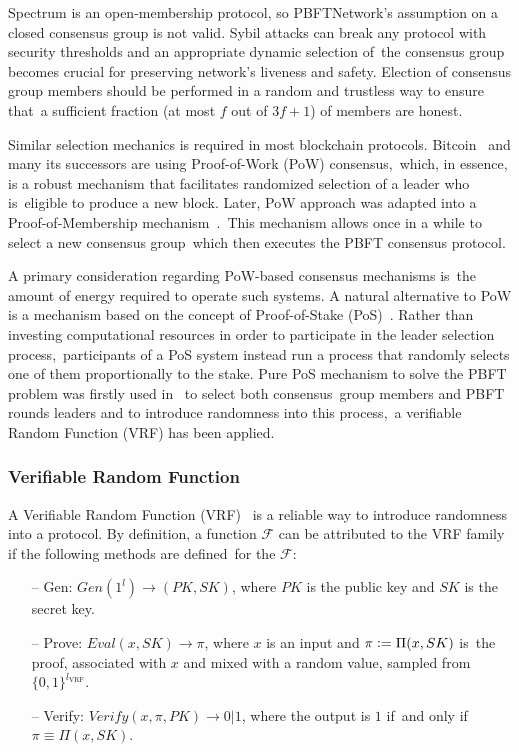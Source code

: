 Spectrum is an open-membership protocol, so PBFTNetwork's assumption on a closed consensus group is not valid.
Sybil attacks can break any protocol with security thresholds and an appropriate dynamic selection of\
the consensus group becomes crucial for preserving network's liveness and safety.
Election of consensus group members should be performed in a random and trustless way to ensure that\
a sufficient fraction (at most $f$ out of ${3 f + 1}$) of members are honest.

Similar selection mechanics is required in most blockchain protocols.
Bitcoin~\cite{nakamoto2009bitcoin} and many its successors are using Proof-of-Work (PoW) consensus,\
which, in essence, is a robust mechanism that facilitates randomized selection of a leader who is\
eligible to produce a new block.
Later, PoW approach was adapted into a Proof-of-Membership mechanism~\cite{kokoriskogias2016enhancing}.\
This mechanism allows once in a while to select a new consensus group\
which then executes the PBFT consensus protocol.

A primary consideration regarding PoW-based consensus mechanisms is\
the amount of energy required to operate such systems.
A natural alternative to PoW is a mechanism based on the concept of Proof-of-Stake (PoS)~\cite{King2012PPCoinPC}.
Rather than investing computational resources in order to participate in the leader selection process,\
participants of a PoS system instead run a process that randomly selects one of them proportionally to the stake.
Pure PoS mechanism to solve the PBFT problem was firstly used in~\cite{cryptoeprint:2017/454} to select both consensus\
group members and PBFT rounds leaders and to introduce randomness into this process,\
a verifiable Random Function (VRF) has been applied.

\subsubsection{Verifiable Random Function}

A Verifiable Random Function (VRF)~\cite{Micali1999} is a reliable way to introduce randomness into a protocol.
By definition, a function $\mathcal{F}$ can be attributed to the VRF family if the following methods are defined\
for the $\mathcal{F}$:
\begin{itemize}
    \item[--] Gen: ${Gen(1^l) \rightarrow (PK, SK)}$, where $PK$ is the public key and $SK$ is the secret key.
    \item[--] Prove: ${Eval(x, SK) \rightarrow \pi}$, where $x$ is an input and $\pi \vcentcolon= \Pi(x, SK)$ is\
    the proof, associated with $x$ and mixed with a random value, sampled from $\{0,1\}^{l_{\text{VRF}}}$.
    \item[--] Verify: ${Verify(x, \pi, PK) \rightarrow 0 | 1}$, where the output is $1$ if\
    and only if ${\pi \equiv \Pi(x, SK)}$.
\end{itemize}

